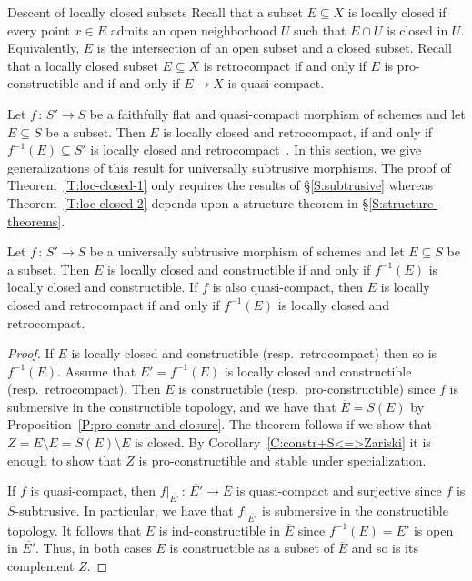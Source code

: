 \documentclass[a4paper,twoside,11pt]{amsart}[2009/07/02] %
\newcommand{\pref}[1]{\eqref{#1}}
\newcommand{\map}[3]{#1\,:\, #2\rightarrow #3}
\begin{document}
\begin{section}{Descent of locally closed subsets}\label{S:loc-closed}
Recall that a subset $E\subseteq X$ is locally closed if every point $x\in E$
admits an open neighborhood $U$ such that $E\cap U$ is closed in
$U$. Equivalently, $E$ is the intersection of an open subset and a closed
subset.
%
Recall that a locally closed subset $E\subseteq X$ is retrocompact if and only
if $E$ is pro-constructible and if and only if $E\to X$ is quasi-compact.

Let $\map{f}{S'}{S}$ be a faithfully flat and quasi-compact morphism of schemes
and let $E\subseteq S$ be a subset. Then $E$ is locally closed and
retrocompact, if and only if $f^{-1}(E)\subseteq S'$ is locally closed and
retrocompact~\cite[Prop.~7.3.7]{egaI_NE}.
In this section, we give generalizations of this result for
universally subtrusive morphisms. The proof of Theorem~\pref{T:loc-closed-1}
only requires the results of \S\pref{S:subtrusive} whereas
Theorem~\pref{T:loc-closed-2} depends upon a structure theorem in
\S\pref{S:structure-theorems}.



\begin{theorem}\label{T:loc-closed-1}
Let $\map{f}{S'}{S}$ be a universally subtrusive morphism of schemes and let
$E\subseteq S$ be a subset. Then $E$ is locally closed and constructible if and
only if $f^{-1}(E)$ is locally closed and constructible. If
%
$f$ is also quasi-compact,
%
then $E$ is locally closed and retrocompact if and only if $f^{-1}(E)$ is
locally closed and retrocompact.
\end{theorem}
\begin{proof}
If $E$ is locally closed and constructible (resp.\ retrocompact) then so is
$f^{-1}(E)$. Assume that $E'=f^{-1}(E)$ is locally closed and constructible
(resp.\ retrocompact). Then $E$ is constructible (resp.\ pro-constructible) since
$f$ is submersive in the constructible topology, and we have that
$\overline{E}=S(E)$ by Proposition~\pref{P:pro-constr-and-closure}. The theorem
follows if we show that $Z=\overline{E}\setminus E=S(E)\setminus E$ is
closed. By Corollary~\pref{C:constr+S<=>Zariski} it is enough to show that $Z$
is pro-constructible and stable under specialization.

If $f$ is quasi-compact, then
$\map{f|_{\overline{E'}}}{\overline{E'}}{\overline{E}}$ is quasi-compact and
surjective since $f$ is $S$-subtrusive. In particular, we have that
$f|_{\overline{E'}}$ is submersive in the constructible topology. It follows
that $E$ is ind-constructible in $\overline{E}$ since $f^{-1}(E)=E'$ is open in
$\overline{E'}$. Thus, in both cases $E$ is constructible as a subset
of $\overline{E}$ and so is its complement $Z$.



\end{proof}
\end{section}
\end{document}
